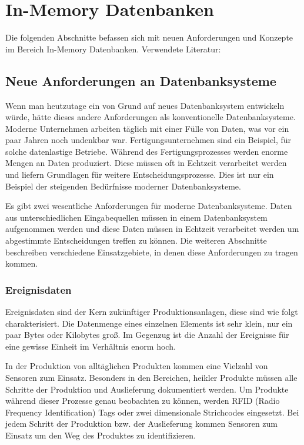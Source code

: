 \documentclass[draft,final]{vutinfth} %
\begin{document}
\chapter{In-Memory Datenbanken}
Die folgenden Abschnitte befassen sich mit neuen Anforderungen und Konzepte im Bereich In-Memory Datenbanken. Verwendete Literatur: \cite{BookInMem}
\section{Neue Anforderungen an Datenbanksysteme}
Wenn man heutzutage ein von Grund auf neues Datenbanksystem entwickeln würde, hätte dieses andere Anforderungen als konventionelle Datenbanksysteme. Moderne Unternehmen arbeiten täglich mit einer Fülle von Daten, was vor ein paar Jahren noch undenkbar war. Fertigungsunternehmen sind ein Beispiel, für solche datenlastige Betriebe. Während des Fertigungsprozesses werden enorme Mengen an Daten produziert. Diese müssen oft in Echtzeit verarbeitet werden und liefern Grundlagen für weitere Entscheidungsprozesse. Dies ist nur ein Beispiel der steigenden Bedürfnisse moderner Datenbanksysteme. 

Es gibt zwei wesentliche Anforderungen für moderne Datenbanksysteme. Daten aus unterschiedlichen Eingabequellen müssen in einem Datenbanksystem aufgenommen werden und diese Daten müssen in Echtzeit verarbeitet werden um abgestimmte Entscheidungen treffen zu können. Die weiteren Abschnitte beschreiben verschiedene Einsatzgebiete, in denen diese Anforderungen zu tragen kommen.

\subsection*{Ereignisdaten}
Ereignisdaten sind der Kern zukünftiger Produktionsanlagen, diese sind wie folgt charakterisiert. Die Datenmenge eines einzelnen Elements ist sehr klein, nur ein paar Bytes oder Kilobytes gro\ss . Im Gegenzug ist die Anzahl der Ereignisse für eine gewisse Einheit im Verhältnis enorm hoch. 

In der Produktion von alltäglichen Produkten kommen eine Vielzahl von Sensoren zum Einsatz. Besonders in den Bereichen, heikler Produkte müssen alle Schritte der Produktion und Auslieferung dokumentiert werden. Um Produkte während dieser Prozesse genau beobachten zu können, werden RFID (Radio Frequency Identification) Tags oder zwei dimensionale Strichcodes eingesetzt. Bei jedem Schritt der Produktion bzw. der Auslieferung kommen Sensoren zum Einsatz um den Weg des Produktes zu identifizieren. 
\end{document}

